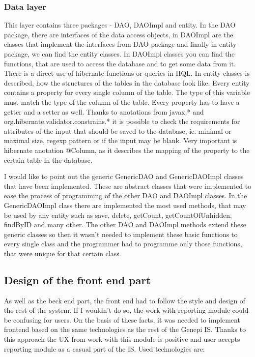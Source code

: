 \documentclass[thesis=B,english]{FITthesis}[2012/10/20]
\begin{document}
\subsubsection{Data layer}
This layer contains three packages - DAO, DAOImpl and entity. In the DAO package, there are interfaces of the data access objects, in DAOImpl are the classes that implement the interfaces from DAO package and finally in entity package, we can find the entity classes.
In DAOImpl classes you can find the functions, that are used to access the database and to get some data from it. There is a direct use of hibernate functions or queries in HQL.
In entity classes is described, how the structures of the tables in the database look like. Every entity contains a property for every single column of the table. The type of this variable must match the type of the column of the table. Every property has to have a getter and a setter as well. Thanks to anotations from javax.* and org.hibernate.validator.constrains.* it is possible to check the requirements for attributes of the input that should be saved to the database, ie. minimal or maximal size, regexp pattern or if the input may be blank. Very important is hibernate anotation @Column, as it describes the mapping of the property to the certain table in the database.

I would like to point out the generic GenericDAO and GenericDAOImpl classes that have been implemented.
These are abstract classes that were implemented to ease the process of programming of the other DAO and DAOImpl classes. In the GenericDAOImpl class there are implemented the most used methods, that may be used by any entity such as save, delete, getCount, getCountOfUnhidden, findByID and many other. The other DAO and DAOImpl methods extend these generic classes so then it wasn't needed to implement these basic functions to every single class and the programmer had to programme only those functions, that were unique for that certain class.

\subsection{Design of the front end part}
As well as the beck end part, the front end had to follow the style and design of the rest of the system. If I wouldn't do so, the work with reporting module could be confusing for users. On the basis of these facts, it was needed to implement frontend based on the same technologies as the rest of the Genepi IS. Thanks to this approach the UX from work with this module is positive and user accepts reporting module as a casual part of the IS.
Used technologies are:
\end{document}
